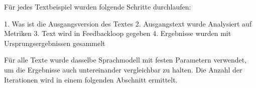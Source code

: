 
Für jedes Textbeispiel wurden folgende Schritte durchlaufen:

1. Was ist die Ausgangsversion des Textes
2. Ausgangstext wurde Analysiert auf Metriken
3. Text wird in Feedbackloop gegeben
4. Ergebnisse wurden mit Ursprungsergebnissen gesammelt

Für alle Texte wurde dasselbe Sprachmodell mit festen Parametern verwendet, um die Ergebnisse auch untereinander vergleichbar zu halten.
Die Anzahl der Iterationen wird in einem folgenden Abschnitt ermittelt.